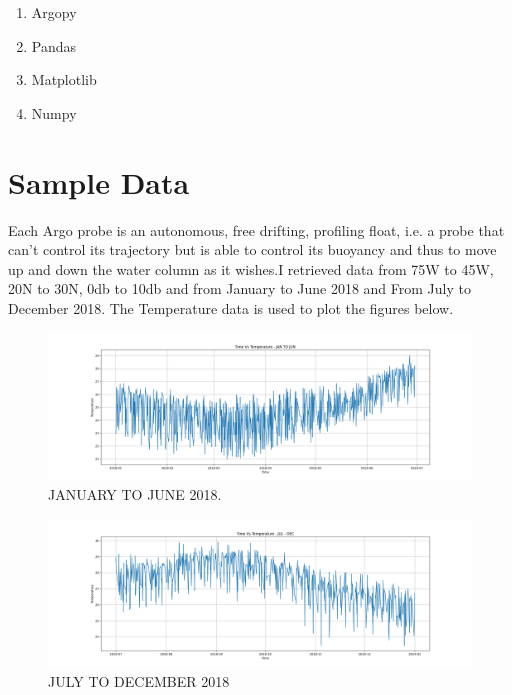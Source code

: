 \documentclass{article}
\begin{document}
\begin{enumerate}
\item Argopy
\item Pandas 
\item Matplotlib
\item Numpy 
\end{enumerate}


\section{Sample Data}

Each Argo probe is an autonomous, free drifting, profiling float, i.e. a probe that can’t control its trajectory but is able to control its buoyancy and thus to move up and down the water column as it wishes.I retrieved data from 75W to 45W, 20N to 30N, 0db to 10db and from January to June 2018 and From July to December 2018. The Temperature data is used to plot the figures below.

\begin{figure}[h]
\begin{center}
\includegraphics[width=1\textwidth]{JAN_JUN.png} %
\caption{JANUARY TO JUNE 2018.}
\end{center}
\end{figure}

\begin{figure}[h]
\begin{center}
\includegraphics[width=1\textwidth]{JUL_DEC.png} %
\caption{JULY TO DECEMBER 2018}
\end{center}
\end{figure}
\end{document}
